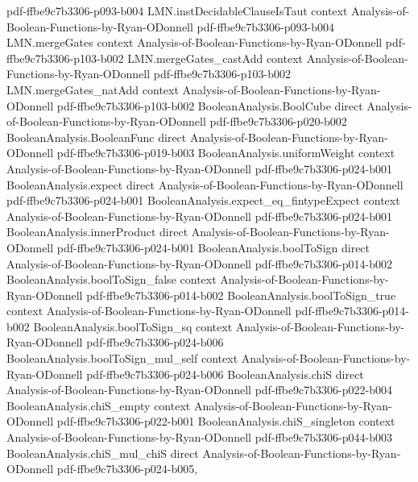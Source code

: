 \begin{theorem}
  {pdf-ffbe9c7b3306-p093-b004}
\proofstep
  {LMN.instDecidableClauseIsTaut}
  {context}
  {Analysis-of-Boolean-Functions-by-Ryan-ODonnell}
  {pdf-ffbe9c7b3306-p093-b004}
\proofstep
  {LMN.mergeGates}
  {context}
  {Analysis-of-Boolean-Functions-by-Ryan-ODonnell}
  {pdf-ffbe9c7b3306-p103-b002}
\proofstep
  {LMN.mergeGates_castAdd}
  {context}
  {Analysis-of-Boolean-Functions-by-Ryan-ODonnell}
  {pdf-ffbe9c7b3306-p103-b002}
\proofstep
  {LMN.mergeGates_natAdd}
  {context}
  {Analysis-of-Boolean-Functions-by-Ryan-ODonnell}
  {pdf-ffbe9c7b3306-p103-b002}
\proofstep
  {BooleanAnalysis.BoolCube}
  {direct}
  {Analysis-of-Boolean-Functions-by-Ryan-ODonnell}
  {pdf-ffbe9c7b3306-p020-b002}
\proofstep
  {BooleanAnalysis.BooleanFunc}
  {direct}
  {Analysis-of-Boolean-Functions-by-Ryan-ODonnell}
  {pdf-ffbe9c7b3306-p019-b003}
\proofstep
  {BooleanAnalysis.uniformWeight}
  {context}
  {Analysis-of-Boolean-Functions-by-Ryan-ODonnell}
  {pdf-ffbe9c7b3306-p024-b001}
\proofstep
  {BooleanAnalysis.expect}
  {direct}
  {Analysis-of-Boolean-Functions-by-Ryan-ODonnell}
  {pdf-ffbe9c7b3306-p024-b001}
\proofstep
  {BooleanAnalysis.expect_eq_fintypeExpect}
  {context}
  {Analysis-of-Boolean-Functions-by-Ryan-ODonnell}
  {pdf-ffbe9c7b3306-p024-b001}
\proofstep
  {BooleanAnalysis.innerProduct}
  {direct}
  {Analysis-of-Boolean-Functions-by-Ryan-ODonnell}
  {pdf-ffbe9c7b3306-p024-b001}
\proofstep
  {BooleanAnalysis.boolToSign}
  {direct}
  {Analysis-of-Boolean-Functions-by-Ryan-ODonnell}
  {pdf-ffbe9c7b3306-p014-b002}
\proofstep
  {BooleanAnalysis.boolToSign_false}
  {context}
  {Analysis-of-Boolean-Functions-by-Ryan-ODonnell}
  {pdf-ffbe9c7b3306-p014-b002}
\proofstep
  {BooleanAnalysis.boolToSign_true}
  {context}
  {Analysis-of-Boolean-Functions-by-Ryan-ODonnell}
  {pdf-ffbe9c7b3306-p014-b002}
\proofstep
  {BooleanAnalysis.boolToSign_sq}
  {context}
  {Analysis-of-Boolean-Functions-by-Ryan-ODonnell}
  {pdf-ffbe9c7b3306-p024-b006}
\proofstep
  {BooleanAnalysis.boolToSign_mul_self}
  {context}
  {Analysis-of-Boolean-Functions-by-Ryan-ODonnell}
  {pdf-ffbe9c7b3306-p024-b006}
\proofstep
  {BooleanAnalysis.chiS}
  {direct}
  {Analysis-of-Boolean-Functions-by-Ryan-ODonnell}
  {pdf-ffbe9c7b3306-p022-b004}
\proofstep
  {BooleanAnalysis.chiS_empty}
  {context}
  {Analysis-of-Boolean-Functions-by-Ryan-ODonnell}
  {pdf-ffbe9c7b3306-p022-b001}
\proofstep
  {BooleanAnalysis.chiS_singleton}
  {context}
  {Analysis-of-Boolean-Functions-by-Ryan-ODonnell}
  {pdf-ffbe9c7b3306-p044-b003}
\proofstep
  {BooleanAnalysis.chiS_mul_chiS}
  {direct}
  {Analysis-of-Boolean-Functions-by-Ryan-ODonnell}
  {pdf-ffbe9c7b3306-p024-b005,
}
\end{theorem}
